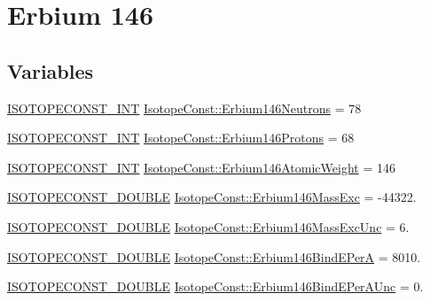 \hypertarget{group___isotope_const-_erbium-_er146}{}\section{Erbium 146}
\label{group___isotope_const-_erbium-_er146}
\subsection*{Variables}
\begin{DoxyCompactItemize}
\item 
\mbox{\hyperlink{group___isotope_const-_macros_ga5f18360b3e99483a35c32d789e62621c}{I\+S\+O\+T\+O\+P\+E\+C\+O\+N\+S\+T\+\_\+\+I\+NT}} \mbox{\hyperlink{group___isotope_const-_erbium-_er146_ga8fb476ba7a489a03ee4f20b9a8fdb7d4}{Isotope\+Const\+::\+Erbium146\+Neutrons}} = 78
\item 
\mbox{\hyperlink{group___isotope_const-_macros_ga5f18360b3e99483a35c32d789e62621c}{I\+S\+O\+T\+O\+P\+E\+C\+O\+N\+S\+T\+\_\+\+I\+NT}} \mbox{\hyperlink{group___isotope_const-_erbium-_er146_gaa96b5ee1a061f07e64ebda43e6a87ef5}{Isotope\+Const\+::\+Erbium146\+Protons}} = 68
\item 
\mbox{\hyperlink{group___isotope_const-_macros_ga5f18360b3e99483a35c32d789e62621c}{I\+S\+O\+T\+O\+P\+E\+C\+O\+N\+S\+T\+\_\+\+I\+NT}} \mbox{\hyperlink{group___isotope_const-_erbium-_er146_ga049432048cdbf464fdec5976b3459618}{Isotope\+Const\+::\+Erbium146\+Atomic\+Weight}} = 146
\item 
\mbox{\hyperlink{group___isotope_const-_macros_ga8f45a7272ce02c0b4c65c44636ed719a}{I\+S\+O\+T\+O\+P\+E\+C\+O\+N\+S\+T\+\_\+\+D\+O\+U\+B\+LE}} \mbox{\hyperlink{group___isotope_const-_erbium-_er146_ga19395ba6cf158b318c9fe477e0fb7719}{Isotope\+Const\+::\+Erbium146\+Mass\+Exc}} = -\/44322.
\item 
\mbox{\hyperlink{group___isotope_const-_macros_ga8f45a7272ce02c0b4c65c44636ed719a}{I\+S\+O\+T\+O\+P\+E\+C\+O\+N\+S\+T\+\_\+\+D\+O\+U\+B\+LE}} \mbox{\hyperlink{group___isotope_const-_erbium-_er146_ga5aaeea33fd3c2cd62d40d9f5fc0728cb}{Isotope\+Const\+::\+Erbium146\+Mass\+Exc\+Unc}} = 6.
\item 
\mbox{\hyperlink{group___isotope_const-_macros_ga8f45a7272ce02c0b4c65c44636ed719a}{I\+S\+O\+T\+O\+P\+E\+C\+O\+N\+S\+T\+\_\+\+D\+O\+U\+B\+LE}} \mbox{\hyperlink{group___isotope_const-_erbium-_er146_ga443eba42f2ab5768eea1a8419b1b809f}{Isotope\+Const\+::\+Erbium146\+Bind\+E\+PerA}} = 8010.
\item 
\mbox{\hyperlink{group___isotope_const-_macros_ga8f45a7272ce02c0b4c65c44636ed719a}{I\+S\+O\+T\+O\+P\+E\+C\+O\+N\+S\+T\+\_\+\+D\+O\+U\+B\+LE}} \mbox{\hyperlink{group___isotope_const-_erbium-_er146_ga1598594444ee5a6ec1d83c6d287c0ebb}{Isotope\+Const\+::\+Erbium146\+Bind\+E\+Per\+A\+Unc}} = 0.

\end{DoxyCompactItemize}
